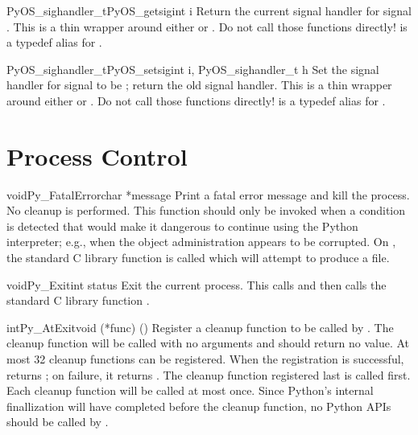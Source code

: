 \begin{cfuncdesc}{PyOS_sighandler_t}{PyOS_getsig}{int i}
  Return the current signal handler for signal .  This is a
  thin wrapper around either  or
  .  Do not call those functions directly!
   is a typedef alias for .
\end{cfuncdesc}

\begin{cfuncdesc}{PyOS_sighandler_t}{PyOS_setsig}{int i, PyOS_sighandler_t h}
  Set the signal handler for signal  to be ; return the
  old signal handler.  This is a thin wrapper around either
   or .  Do not call those
  functions directly!   is a typedef alias
  for .
\end{cfuncdesc}


\section{Process Control \label{processControl}}

\begin{cfuncdesc}{void}{Py_FatalError}{char *message}
  Print a fatal error message and kill the process.  No cleanup is
  performed.  This function should only be invoked when a condition is
  detected that would make it dangerous to continue using the Python
  interpreter; e.g., when the object administration appears to be
  corrupted.  On \UNIX, the standard C library function
   is called which will attempt to
  produce a  file.
\end{cfuncdesc}

\begin{cfuncdesc}{void}{Py_Exit}{int status}
  Exit the current process.  This calls
   and then calls the
  standard C library function
  .
\end{cfuncdesc}

\begin{cfuncdesc}{int}{Py_AtExit}{void (*func) ()}
  Register a cleanup function to be called by
  .  The cleanup
  function will be called with no arguments and should return no
  value.  At most 32 cleanup functions can be
  registered.  When the registration is successful,
   returns ; on failure, it returns
  .  The cleanup function registered last is called first.
  Each cleanup function will be called at most once.  Since Python's
  internal finallization will have completed before the cleanup
  function, no Python APIs should be called by .
\end{cfuncdesc}


